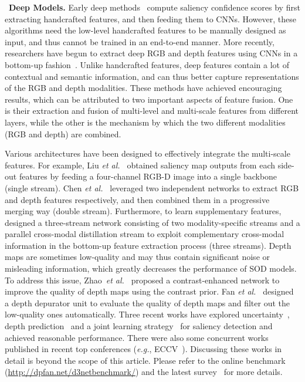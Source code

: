 \documentclass[journal]{IEEEtran}
\newcommand{\supp}[1]{\textcolor{magenta}{#1}}
\newcommand{\myPara}[1]{\vspace{10pt}\noindent~\textbf{#1} \quad}
\def\eg{\emph{e.g.}}
\def\etal{{\em et al.~}}
\begin{document}
\myPara{\textbf{Deep Models.}}
Early deep methods~\cite{qu2017DF,Shigematsu2017BED} compute saliency confidence scores by first extracting handcrafted features, and then feeding them to CNNs.
However, these algorithms need the low-level handcrafted features to be manually designed as input, and thus cannot be trained in an end-to-end manner.
More recently, researchers have begun to extract deep RGB and depth features using CNNs in a bottom-up fashion~\cite{han2018CTMF}.
Unlike handcrafted features, deep features contain a lot of contextual and semantic information, and can thus better capture representations of the RGB and depth modalities.
These methods have achieved encouraging results, which can be attributed to two important aspects of feature fusion.
One is their extraction and fusion of multi-level and multi-scale features from different layers, while the other is the mechanism by which the two different modalities (RGB and depth) are combined.\par


Various architectures have been designed to effectively integrate the multi-scale features.
For example, Liu \etal\cite{LIU2019SSRC} obtained saliency map outputs from each side-out features by feeding a four-channel RGB-D image into a single backbone (single stream).
Chen \etal\cite{chen2018PCF} leveraged two independent networks to extract RGB and depth features respectively, and then combined them in a progressive merging way (double stream).
Furthermore, to learn supplementary features,~\cite{chen2019TANet} designed a three-stream network consisting of two modality-specific streams and a parallel cross-modal distillation stream to exploit complementary cross-modal information in the bottom-up feature extraction process (three streams).
Depth maps are sometimes low-quality and may thus contain significant noise or misleading information, which greatly decreases the performance of SOD models.
To address this issue, Zhao~\etal\cite{zhao2019CPFP} proposed a contrast-enhanced network to improve the quality of depth maps using the contrast prior.
Fan \etal\cite{fan2019D3Net} designed a depth depurator unit to evaluate the quality of depth maps and filter out the low-quality ones automatically.
Three recent works have explored uncertainty~\cite{Zhang2020UCNet}, depth prediction~\cite{wang2020synergistic} and a joint learning strategy~\cite{Fu2020JLDCF} for saliency detection and achieved reasonable performance.
There were also some concurrent works published in recent top conferences (\eg, ECCV~\cite{Luo_2020_ECCV,zhao2020single,li2020rgbd}).
Discussing these works in detail is beyond the scope of this article. Please refer to the online benchmark (\supp{\href{http://dpfan.net/d3netbenchmark/}{http://dpfan.net/d3netbenchmark/}}) and the latest survey~\cite{zhou2020rgbd} for more details.
\end{document}
